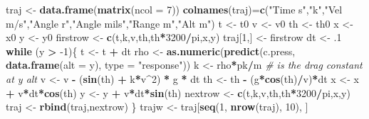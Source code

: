 \documentclass[
]{article}
\newenvironment{Shaded}{\begin{snugshade}}{\end{snugshade}}
\newcommand{\CommentTok}[1]{\textcolor[rgb]{0.56,0.35,0.01}{\textit{#1}}}
\newcommand{\ControlFlowTok}[1]{\textcolor[rgb]{0.13,0.29,0.53}{\textbf{#1}}}
\newcommand{\DataTypeTok}[1]{\textcolor[rgb]{0.13,0.29,0.53}{#1}}
\newcommand{\DecValTok}[1]{\textcolor[rgb]{0.00,0.00,0.81}{#1}}
\newcommand{\FloatTok}[1]{\textcolor[rgb]{0.00,0.00,0.81}{#1}}
\newcommand{\KeywordTok}[1]{\textcolor[rgb]{0.13,0.29,0.53}{\textbf{#1}}}
\newcommand{\NormalTok}[1]{#1}
\newcommand{\OperatorTok}[1]{\textcolor[rgb]{0.81,0.36,0.00}{\textbf{#1}}}
\newcommand{\StringTok}[1]{\textcolor[rgb]{0.31,0.60,0.02}{#1}}
\begin{document}
\begin{Shaded}
\begin{Highlighting}[]
\NormalTok{traj <-}\StringTok{ }\KeywordTok{data.frame}\NormalTok{(}\KeywordTok{matrix}\NormalTok{(}\DataTypeTok{ncol =} \DecValTok{7}\NormalTok{))}
\KeywordTok{colnames}\NormalTok{(traj)=}\KeywordTok{c}\NormalTok{(}\StringTok{"Time s"}\NormalTok{,}\StringTok{"k"}\NormalTok{,}\StringTok{"Vel m/s"}\NormalTok{,}\StringTok{"Angle r"}\NormalTok{,}\StringTok{"Angle mils"}\NormalTok{,}\StringTok{"Range m"}\NormalTok{,}\StringTok{"Alt m"}\NormalTok{)}
\NormalTok{t <-}\StringTok{ }\NormalTok{t0}
\NormalTok{v <-}\StringTok{ }\NormalTok{v0}
\NormalTok{th <-}\StringTok{ }\NormalTok{th0}
\NormalTok{x <-}\StringTok{ }\NormalTok{x0}
\NormalTok{y <-}\StringTok{ }\NormalTok{y0}
\NormalTok{firstrow <-}\StringTok{ }\KeywordTok{c}\NormalTok{(t,k,v,th,th}\OperatorTok{*}\DecValTok{3200}\OperatorTok{/}\NormalTok{pi,x,y)}
\NormalTok{traj[}\DecValTok{1}\NormalTok{,] <-}\StringTok{ }\NormalTok{firstrow}
\NormalTok{dt <-}\StringTok{ }\FloatTok{.1}
\ControlFlowTok{while}\NormalTok{ (y }\OperatorTok{>}\StringTok{ }\DecValTok{-1}\NormalTok{)\{}
\NormalTok{t <-}\StringTok{ }\NormalTok{t }\OperatorTok{+}\StringTok{ }\NormalTok{dt}
\NormalTok{rho <-}\StringTok{ }\KeywordTok{as.numeric}\NormalTok{(}\KeywordTok{predict}\NormalTok{(c.press, }\KeywordTok{data.frame}\NormalTok{(}\DataTypeTok{alt =}\NormalTok{ y), }\DataTypeTok{type =} \StringTok{"response"}\NormalTok{))}
\NormalTok{k <-}\StringTok{ }\NormalTok{rho}\OperatorTok{*}\NormalTok{pk}\OperatorTok{/}\NormalTok{m }\CommentTok{# is the drag constant at y alt}
\NormalTok{v <-}\StringTok{ }\NormalTok{v }\OperatorTok{-}\StringTok{ }\NormalTok{(}\KeywordTok{sin}\NormalTok{(th) }\OperatorTok{+}\StringTok{ }\NormalTok{k}\OperatorTok{*}\NormalTok{v}\OperatorTok{^}\DecValTok{2}\NormalTok{) }\OperatorTok{*}\StringTok{ }\NormalTok{g }\OperatorTok{*}\StringTok{ }\NormalTok{dt}
\NormalTok{th <-}\StringTok{ }\NormalTok{th }\OperatorTok{-}\StringTok{ }\NormalTok{(g}\OperatorTok{*}\KeywordTok{cos}\NormalTok{(th)}\OperatorTok{/}\NormalTok{v)}\OperatorTok{*}\NormalTok{dt}
\NormalTok{x <-}\StringTok{ }\NormalTok{x }\OperatorTok{+}\StringTok{ }\NormalTok{v}\OperatorTok{*}\NormalTok{dt}\OperatorTok{*}\KeywordTok{cos}\NormalTok{(th)}
\NormalTok{y <-}\StringTok{ }\NormalTok{y }\OperatorTok{+}\StringTok{ }\NormalTok{v}\OperatorTok{*}\NormalTok{dt}\OperatorTok{*}\KeywordTok{sin}\NormalTok{(th)}
\NormalTok{nextrow <-}\StringTok{ }\KeywordTok{c}\NormalTok{(t,k,v,th,th}\OperatorTok{*}\DecValTok{3200}\OperatorTok{/}\NormalTok{pi,x,y)}
\NormalTok{traj <-}\StringTok{ }\KeywordTok{rbind}\NormalTok{(traj,nextrow)}
\NormalTok{\}}
\NormalTok{trajw <-}\StringTok{ }\NormalTok{traj[}\KeywordTok{seq}\NormalTok{(}\DecValTok{1}\NormalTok{, }\KeywordTok{nrow}\NormalTok{(traj), }\DecValTok{10}\NormalTok{), ]}

\end{Highlighting}
\end{Shaded}
\end{document}

